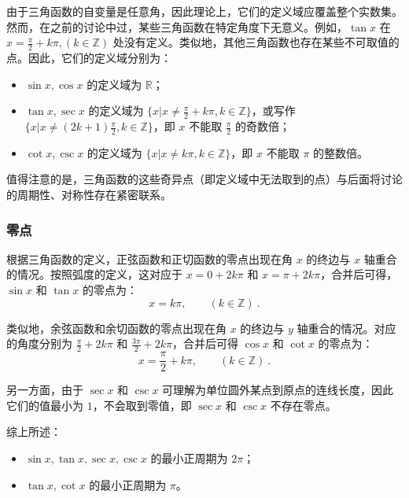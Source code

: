 由于三角函数的自变量是任意角，因此理论上，它们的定义域应覆盖整个实数集。然而，在之前的讨论中过，某些三角函数在特定角度下无意义。例如，$\tan x$ 在 $\displaystyle x=\frac{\pi}{2}+k\pi, (k\in\mathbb{Z})$ 处没有定义。类似地，其他三角函数也存在某些不可取值的点。因此，它们的定义域分别为：
\begin{itemize}
\item $\sin x,\cos x$ 的定义域为 $\mathbb{R}$；
\item $\tan x,\sec x$ 的定义域为 $\displaystyle\{x|x\neq\frac{\pi}{2}+k\pi,k\in\mathbb{Z}\}$，或写作$\displaystyle\{x|x\neq(2k+1)\frac{\pi}{2},k\in\mathbb{Z}\}$，即 $x$ 不能取 $\frac{\pi}{2}$ 的奇数倍；
\item $\cot x,\csc x$ 的定义域为 $\displaystyle\{x|x\neq k\pi,k\in\mathbb{Z}\}$，即 $x$ 不能取 $\pi$ 的整数倍。
\end{itemize}

值得注意的是，三角函数的这些奇异点（即定义域中无法取到的点）与后面将讨论的周期性、对称性存在紧密联系。

\subsubsection{零点}

根据三角函数的定义，正弦函数和正切函数的零点出现在角 $x$ 的终边与 $x$ 轴重合的情况。按照弧度的定义，这对应于 $x = 0+2k\pi$ 和 $x = \pi+2k\pi$，合并后可得， $\sin x$ 和 $\tan x$ 的零点为：
\begin{equation}\label{eq_HsTFFv_1}
x = k\pi, \qquad (k\in\mathbb{Z})~.
\end{equation}

类似地，余弦函数和余切函数的零点出现在角 $x$ 的终边与 $y$ 轴重合的情况。对应的角度分别为 $\displaystyle{\frac{\pi}{2}} + 2k\pi$ 和 $\displaystyle{\frac{3\pi}{2}} + 2k\pi$，合并后可得 $\cos x$ 和 $\cot x$ 的零点为：
\begin{equation}
x = \frac{\pi}{2} + k\pi, \qquad (k\in\mathbb{Z})~.
\end{equation}

另一方面，由于 $\sec x$ 和 $\csc x$ 可理解为单位圆外某点到原点的连线长度，因此它们的值最小为 $1$，不会取到零值，即 $\sec x$ 和 $\csc x$ 不存在零点。

综上所述：
\begin{itemize}
\item $\sin x, \tan x, \sec x, \csc x$ 的最小正周期为 $2\pi$；
\item $\tan x, \cot x$ 的最小正周期为 $\pi$。
\end{itemize}


